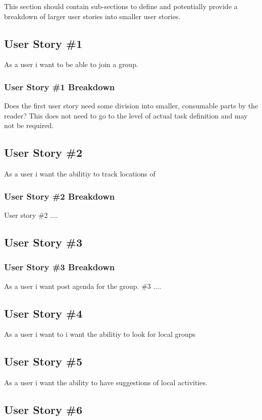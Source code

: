 This section should contain sub-sections to define and potentially provide a breakdown 
of larger user stories into smaller user stories. 



\subsection{User Story \#1 }
As a user i want to be able to join a group.

\subsubsection{User Story \#1 Breakdown}
Does the first user story need some division into smaller, consumable parts by 
the reader?  This does not need to go to the level of actual task definition and 
may not be required. 

\subsection{User Story \#2} 
As a user i want the abilitiy to track locations of 

\subsubsection{User Story \#2 Breakdown}
User story \#2  .... 

\subsection{User Story \#3} 

\subsubsection{User Story \#3 Breakdown}
As a user i want post agenda for the group. \#3  .... 

\subsection{User Story \#4} 
As a user i want to i want the abilitiy to look for local groups
\subsection{User Story \#5} 
As a user i want the ability to have suggestions of local activities.
\subsection{User Story \#6} 
